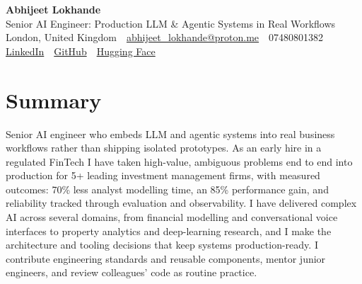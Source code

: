 \documentclass[10pt,a4paper]{article}
\newcommand{\sep}{\,\textcolor{accent!60}{\textbar}\,}
\begin{document}
\begin{center}
  {\fontsize{24}{26}\selectfont\bfseries Abhijeet Lokhande}\\[3pt]
  {\color{accent}\large Senior AI Engineer: Production LLM \& Agentic Systems in Real Workflows}\\[5pt]
  {\small
    London, United Kingdom \sep
    \href{mailto:abhijeet_lokhande@proton.me}{abhijeet\_lokhande@proton.me} \sep
    07480801382 \\[2pt]
    \href{https://www.linkedin.com/in/ablds/}{LinkedIn} \sep
    \href{https://github.com/abhijeetscode}{GitHub} \sep
    \href{https://huggingface.co/ab-ai}{Hugging Face}
  }
\end{center}
\vspace{2pt}

\section{Summary}
Senior AI engineer who embeds LLM and agentic systems into real business workflows rather than shipping isolated prototypes. As an early hire in a regulated FinTech I have taken high-value, ambiguous problems end to end into production for 5+ leading investment management firms, with measured outcomes: 70\% less analyst modelling time, an 85\% performance gain, and reliability tracked through evaluation and observability. I have delivered complex AI across several domains, from financial modelling and conversational voice interfaces to property analytics and deep-learning research, and I make the architecture and tooling decisions that keep systems production-ready. I contribute engineering standards and reusable components, mentor junior engineers, and review colleagues' code as routine practice.

\end{document}
